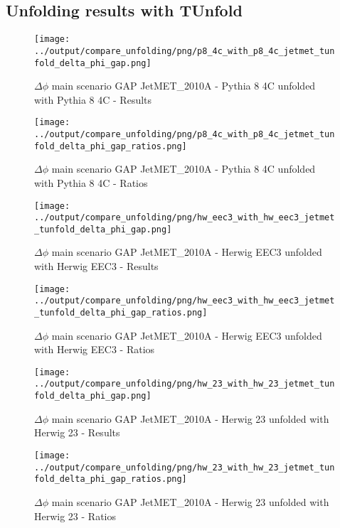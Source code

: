 \documentclass[11pt]{book}
\begin{document}
\clearpage
\subsection{Unfolding results with TUnfold}

\begin{figure}[ht]
\centering
\texttt{[image: ../output/compare\_unfolding/png/p8\_4c\_with\_p8\_4c\_jetmet\_tunfold\_delta\_phi\_gap.png]}
\caption{$\Delta\phi$ main scenario GAP JetMET\_2010A - Pythia 8 4C unfolded with Pythia 8 4C - Results}
\label{p8_p8_jetmet_tunfold_delta_phi_gap_a}
\end{figure}

\begin{figure}[ht]
\centering
\texttt{[image: ../output/compare\_unfolding/png/p8\_4c\_with\_p8\_4c\_jetmet\_tunfold\_delta\_phi\_gap\_ratios.png]}
\caption{$\Delta\phi$ main scenario GAP JetMET\_2010A - Pythia 8 4C unfolded with Pythia 8 4C - Ratios}
\label{p8_p8_jetmet_tunfold_delta_phi_gap_b}
\end{figure}

\begin{figure}[ht]
\centering
\texttt{[image: ../output/compare\_unfolding/png/hw\_eec3\_with\_hw\_eec3\_jetmet\_tunfold\_delta\_phi\_gap.png]}
\caption{$\Delta\phi$ main scenario GAP JetMET\_2010A - Herwig EEC3 unfolded with Herwig EEC3 - Results}
\label{hw_eec3_hw_eec3_jetmet_tunfold_delta_phi_gap_a}
\end{figure}

\begin{figure}[ht]
\centering
\texttt{[image: ../output/compare\_unfolding/png/hw\_eec3\_with\_hw\_eec3\_jetmet\_tunfold\_delta\_phi\_gap\_ratios.png]}
\caption{$\Delta\phi$ main scenario GAP JetMET\_2010A - Herwig EEC3 unfolded with Herwig EEC3 - Ratios}
\label{hw_eec3_hw_eec3_jetmet_tunfold_delta_phi_gap_b}
\end{figure}

\begin{figure}[ht]
\centering
\texttt{[image: ../output/compare\_unfolding/png/hw\_23\_with\_hw\_23\_jetmet\_tunfold\_delta\_phi\_gap.png]}
\caption{$\Delta\phi$ main scenario GAP JetMET\_2010A - Herwig 23 unfolded with Herwig 23 - Results}
\label{hw_23_hw_23_jetmet_tunfold_delta_phi_gap_a}
\end{figure}

\begin{figure}[ht]
\centering
\texttt{[image: ../output/compare\_unfolding/png/hw\_23\_with\_hw\_23\_jetmet\_tunfold\_delta\_phi\_gap\_ratios.png]}
\caption{$\Delta\phi$ main scenario GAP JetMET\_2010A - Herwig 23 unfolded with Herwig 23 - Ratios}
\label{hw_23_hw_23_jetmet_tunfold_delta_phi_gap_b}
\end{figure}
\end{document}
